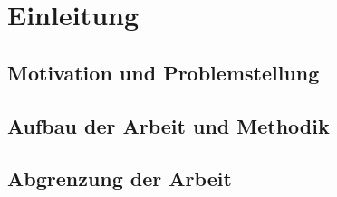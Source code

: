 \section{Einleitung}

\subsection{Motivation und Problemstellung}

\subsection{Aufbau der Arbeit und Methodik}

\subsection{Abgrenzung der Arbeit}
